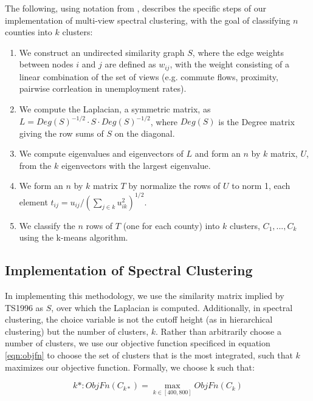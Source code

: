 The following, using notation from \cite{vonLuxburg2007}, describes the specific steps of our implementation of multi-view spectral clustering, with the goal of classifying $n$ counties into $k$ clusters:
\begin{enumerate}
   \item We construct an undirected similarity graph $S$, where the edge weights between nodes $i$ and $j$ are defined as $w_{ij}$, with the weight consisting of a linear combination of the set of views (e.g. commute flows, proximity, pairwise corrleation in unemployment rates).
   \item We compute the Laplacian, a symmetric matrix, as $L=Deg(S)^{-1/2}\cdot S \cdot Deg(S)^{-1/2}$, where $Deg(S)$ is the Degree matrix giving the row sums of $S$ on the diagonal.
   \item We compute eigenvalues and eigenvectors of $L$ and form an $n$ by $k$ matrix, $U$, from the $k$ eigenvectors with the largest eigenvalue.
   \item We form an $n$ by $k$ matrix $T$ by normalize the rows of $U$ to norm 1, each element $t_{ij}=u_{ij}/(\sum_{j \in k}u_{ik}^{2})^{1/2}$.
   \item We classify the $n$ rows of $T$ (one for each county) into $k$ clusters, $C_{1}, ... ,C_{k}$ using the k-means algorithm.
\end{enumerate}

\subsection{Implementation of Spectral Clustering}

In implementing this methodology, we use the similarity matrix implied by TS1996 as $S$, over which the Laplacian is computed. Additionally, in spectral clustering, the choice variable is not the cutoff height (as in hierarchical clustering) but the number of clusters, $k$. Rather than arbitrarily choose a number of clusters, we use our objective function specificed in equation \ref{eqn:objfn} to choose the set of clusters that is the most integrated, such that $k$ maximizes our objective function. Formally, we choose k such that:


\[
k*: ObjFn(C_{k*}) = \max\limits_{k \in [400,800]} ObjFn (C_k)
\]

